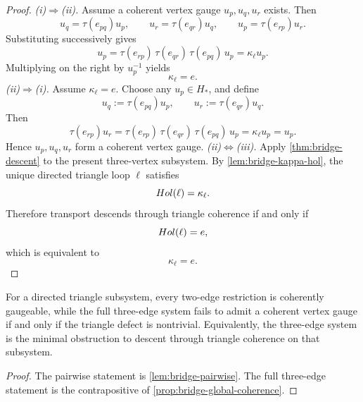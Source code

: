 \begin{proof}
	\emph{\textup{(i)}\(\Rightarrow\)\textup{(ii)}.}
	Assume a coherent vertex gauge \(u_p,u_q,u_r\) exists. Then
	\[
		u_q=\tau(e_{pq})u_p,
		\qquad
		u_r=\tau(e_{qr})u_q,
		\qquad
		u_p=\tau(e_{rp})u_r.
	\]
	Substituting successively gives
	\[
		u_p
		=
		\tau(e_{rp})\,\tau(e_{qr})\,\tau(e_{pq})\,u_p
		=
		\kappa_\ell u_p.
	\]
	Multiplying on the right by \(u_p^{-1}\) yields
	\[
		\kappa_\ell=e.
	\]
	\smallskip
	\noindent
	\emph{\textup{(ii)}\(\Rightarrow\)\textup{(i)}.}
	Assume \(\kappa_\ell=e\). Choose any \(u_p\in H_*\), and define
	\[
		u_q:=\tau(e_{pq})u_p,
		\qquad
		u_r:=\tau(e_{qr})u_q.
	\]
	Then
	\[
		\tau(e_{rp})u_r
		=
		\tau(e_{rp})\,\tau(e_{qr})\,\tau(e_{pq})\,u_p
		=
		\kappa_\ell u_p
		=
		u_p.
	\]
	Hence \(u_p,u_q,u_r\) form a coherent vertex gauge.
	\smallskip
	\noindent
	\emph{\textup{(ii)}\(\Longleftrightarrow\)\textup{(iii)}.}
	Apply \cref{thm:bridge-descent} to the present three-vertex subsystem.
	By \cref{lem:bridge-kappa-hol}, the unique directed triangle loop
	\(\ell\) satisfies
	\[
		Hol(\ell)=\kappa_\ell.
	\]
	Therefore transport descends through triangle coherence if and only if
	\[
		Hol(\ell)=e,
	\]
	which is equivalent to
	\[
		\kappa_\ell=e.
	\]
\end{proof}
\begin{corollary}
	\label{cor:bridge-minimal}
	For a directed triangle subsystem, every two-edge restriction is
	coherently gaugeable, while the full three-edge system fails to admit a
	coherent vertex gauge if and only if the triangle defect is nontrivial.
	Equivalently, the three-edge system is the minimal obstruction to
	descent through triangle coherence on that subsystem.
\end{corollary}
\begin{proof}
	The pairwise statement is \cref{lem:bridge-pairwise}. The full
	three-edge statement is the contrapositive of
	\cref{prop:bridge-global-coherence}.
\end{proof}

